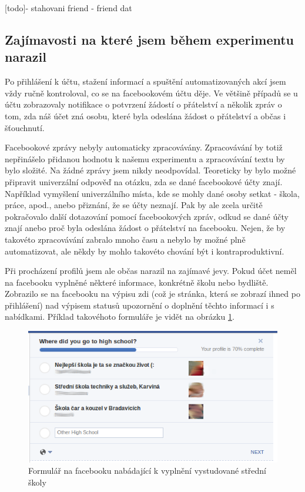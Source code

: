 \documentclass[thesis=M,czech]{FITthesis}[2013/05/10]
\begin{document}
[todo]- stahovani friend - friend dat

\subsection{Zajímavosti na které jsem během experimentu narazil}

Po přihlášení k účtu, stažení informací a spuštění automatizovaných akcí jsem vždy ručně kontroloval, co se na facebookovém účtu děje. Ve většině případů se u účtu zobrazovaly notifikace o potvrzení žádostí o přátelství a několik zpráv o tom, zda náš účet zná osobu, které byla odeslána žádost o přátelství a občas i šťouchnutí.

Facebookové zprávy nebyly automaticky zpracovávány. Zpracovávání by totiž nepřinášelo přidanou hodnotu k našemu experimentu a zpracovávání textu by bylo složité. Na žádné zprávy jsem nikdy neodpovídal. Teoreticky by bylo možné připravit univerzální odpověď na otázku, zda se dané facebookové účty znají. Například vymyšlení univerzálního místa, kde se mohly dané osoby setkat - škola, práce, apod., anebo přiznání, že se účty neznají. Pak by ale zcela určitě pokračovalo další dotazování pomocí facebookových zpráv, odkud se dané účty znají anebo proč byla odeslána žádost o přátelství na facebooku. Nejen, že by takovéto zpracovávání zabralo mnoho času a nebylo by možné plně automatizovat, ale někdy by mohlo takovéto chování být i kontraproduktivní.

Při procházení profilů jsem ale občas narazil na zajímavé jevy. Pokud účet neměl na facebooku vyplněné některé informace, konkrétně školu nebo bydliště. Zobrazilo se na facebooku na výpisu zdi (což je stránka, která se zobrazí ihned po přihlášení) nad výpisem statusů upozornění o doplnění těchto informací i s nabídkami. Příklad takovéhoto formuláře je vidět na obrázku \ref{fig:completeSchool}.

\begin{figure}[h]
\begin{center}
\includegraphics[width=5in]{figures/completeSchool.png}
\caption{Formulář na facebooku nabádající k vyplnění vystudované střední školy}
\label{fig:completeSchool}
\end{center}
\end{figure}
\end{document}
